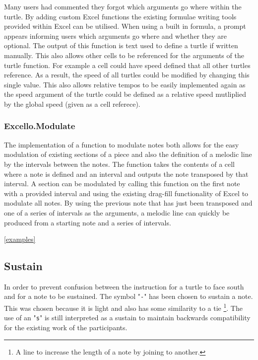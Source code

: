 Many users had commented they forgot which arguments go where within the turtle. By adding custom Excel functions the existing formulae writing tools provided within Excel can be utilised. When using a built in formula, a prompt appears informing users which arguments go where and whether they are optional. The output of this function is text used to define a turtle if written manually. This also allows other cells to be referenced for the arguments of the turtle function. For example a cell could have speed defined that all other turtles reference. As a result, the speed of all turtles could be modified by changing this single value. This also allows relative tempos to be easily implemented again as the speed argument of the turtle could be defined as a relative speed mutliplied by the global speed (given as a cell referece).

\subsubsection{Excello.Modulate}

The implementation of a function to modulate notes both allows for the easy modulation of existing sections of a piece and also the definition of a melodic line by the intervals between the notes. The function takes the contents of a cell where a note is defined and an interval and outputs the note transposed by that interval. A section can be modulated by calling this function on the first note with a provided interval and using the existing drag-fill functionality of Excel to modulate all notes. By using the previous note that has just been transposed and one of a series of intervals as the arguments, a melodic line can quickly be produced from a starting note and a series of intervals.

\ref{examples}

\subsection{Sustain}

In order to prevent confusion between the instruction for a turtle to face south and for a note to be sustained. The symbol "\texttt{-}" has been chosen to sustain a note. This was chosen because it is light and also has some similarity to a tie \footnote{A line to increase the length of a note by joining to another.}. The use of an "\texttt{s}" is still interpreted as a sustain to maintain backwards compatibility for the existing work of the participants.

